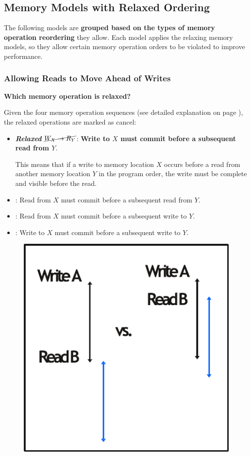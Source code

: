 \subsection{Memory Models with Relaxed Ordering}

The following models are \textbf{grouped based on the types of memory operation reordering} they allow. Each model applies the relaxing memory models, so they allow certain memory operation orders to be violated to improve performance.

\longline

\subsubsection{Allowing Reads to Move Ahead of Writes}

\begin{flushleft}
    \textcolor{Green3}{ \textbf{Which memory operation is relaxed?}}
\end{flushleft}
Given the four memory operation sequences (see detailed explanation on page ), the relaxed operations are marked as cancel:
\begin{itemize}
    \item[\textcolor{Green3}{\faIcon{check}}] \textcolor{Green3}{\textbf{\emph{Relaxed}} $\cancel{W_{X} \rightarrow R_{Y}}$}: \textbf{Write to $X$ must commit before a subsequent read from $Y$}.

    This means that if a write to memory location $X$ occurs before a read from another memory location $Y$ in the program order, the write must be complete and visible before the read.


    \item[\textcolor{Red2}{\faIcon{times}}] : Read from $X$ must commit before a subsequent read from $Y$.
    \item[\textcolor{Red2}{\faIcon{times}}] : Read from $X$ must commit before a subsequent write to $Y$.
    \item[\textcolor{Red2}{\faIcon{times}}] : Write to $X$ must commit before a subsequent write to $Y$.
\end{itemize}
\begin{figure}[!htp]
    \centering
    \includegraphics[width=.4\textwidth]{img/tso-and-pc-1.pdf}
\end{figure}

